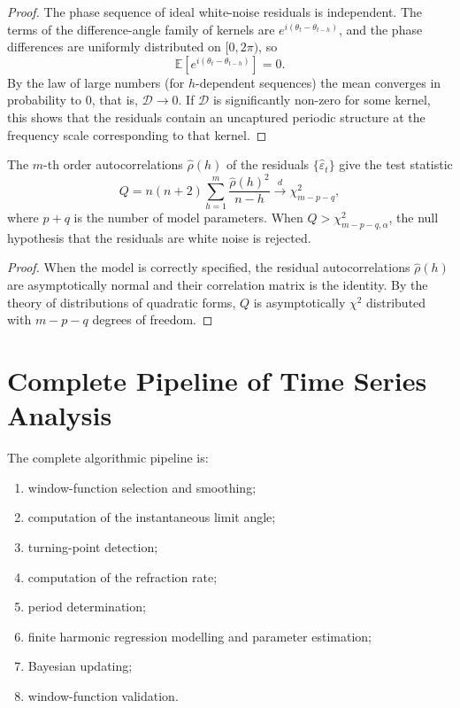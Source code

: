 \begin{proof}
The phase sequence of ideal white-noise residuals is independent. The terms of the difference-angle family of kernels are $e^{i(\theta_t - \theta_{t-h})}$, and the phase differences are uniformly distributed on $[0,2\pi)$, so
\[
\mathbb{E}[e^{i(\theta_t - \theta_{t-h})}] = 0.
\]
By the law of large numbers (for $h$-dependent sequences) the mean converges in probability to $0$, that is, $\mathcal{D} \to 0$. If $\mathcal{D}$ is significantly non-zero for some kernel, this shows that the residuals contain an uncaptured periodic structure at the frequency scale corresponding to that kernel.
\end{proof}

\begin{theorem}\label{thm:ts_ljung_box}
The $m$-th order autocorrelations $\hat\rho(h)$ of the residuals $\{\hat{\varepsilon}_t\}$ give the test statistic
\[
Q=n(n+2)\sum_{h=1}^m\frac{\hat\rho(h)^2}{n-h}\xrightarrow{d}\chi^2_{m-p-q},
\]
where $p+q$ is the number of model parameters. When $Q>\chi^2_{m-p-q,\alpha}$, the null hypothesis that the residuals are white noise is rejected.
\end{theorem}

\begin{proof}
When the model is correctly specified, the residual autocorrelations $\hat\rho(h)$ are asymptotically normal and their correlation matrix is the identity. By the theory of distributions of quadratic forms, $Q$ is asymptotically $\chi^2$ distributed with $m-p-q$ degrees of freedom.
\end{proof}

\section{Complete Pipeline of Time Series Analysis}

\begin{definition}\label{def:ts_algorithm}
The complete algorithmic pipeline is:
\begin{enumerate}[label=(\roman*)]
    \item window-function selection and smoothing;
    \item computation of the instantaneous limit angle;
    \item turning-point detection;
    \item computation of the refraction rate;
    \item period determination;
    \item finite harmonic regression modelling and parameter estimation;
    \item Bayesian updating;
    \item window-function validation.
\end{enumerate}
\end{definition}

